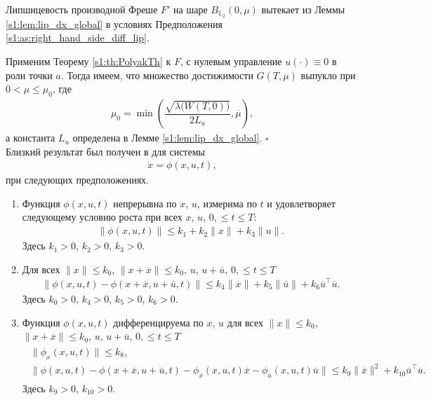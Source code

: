 \documentclass[../main.tex]{subfiles}
\begin{document}
Липшицевость производной Фреше $F'$ на шаре $B_{\mathbb{L}_2}(0,\mu)$ вытекает из Леммы \ref{s1:lem:lip_dx_global} в условиях Предположения \ref{s1:as:right_hand_side_diff_lip}. 
 
Применим Теорему \ref{s1:th:PolyakTh} к $F$, с нулевым управление $u(\cdot) \equiv 0$ в роли точки $a$. 
Тогда имеем, что множество достижимости $G(T,\mu)$ выпукло при $ 0 < \mu \leqslant \mu_0 $, где 
\begin{gather}\label{s1:mu0}
 \mu_0 = \min\left( \dfrac{\sqrt{\lambda\big(W(T,0)\big)}}{2L_u}, \overline{\mu} \right), 
\end{gather}
а константа $L_u $ определена в Лемме \ref{s1:lem:lip_dx_global}. 
\hfill$\square$\\[1ex]%
Близкий результат был получен в \cite{Polyak2004} для системы
\begin{gather}
	\dot{x} = \phi(x,u,t),
\end{gather}
при следующих предположениях.
\begin{enumerate}
	\item Функция $ \phi(x,u,t)$ непрерывна по $x$, $u$, измерима по $t$ и удовлетворяет следующему условию роста при всех $x$, $u$, $0, \leqslant t \leqslant T$:
	\begin{gather}
		\|\phi(x,u,t) \| \leqslant k_1 + k_2 \|x\| + k_3 \|u\|.
	\end{gather}
	Здесь $k_1 > 0$, $k_2 > 0$, $k_3 > 0$.
	
	\item Для всех $\|x\| \leqslant k_0$, $\|x + \overline{x}\| \leqslant k_0$, $u$, $u + \overline{u}$, $0, \leqslant t \leqslant T$
	\begin{gather}
		\|\phi(x,u,t) - \phi(x + \overline{x},u + \overline{u},t)\| \leqslant k_4 \|\overline{x}\| + k_5 \|\overline{u}\| + k_6 \overline{u}^{\top} \overline{u}.
	\end{gather}
	Здесь $k_0 > 0$, $k_4 > 0$, $k_5 > 0$, $k_6 > 0$.
	
	\item Функция $ \phi(x,u,t)$ дифференцируема по $x$, $u$ для всех $\|x\| \leqslant k_0$, $\|x + \overline{x}\| \leqslant k_0$, $u$, $u + \overline{u}$, $0, \leqslant t \leqslant T$
	\begin{gather}
	\begin{gathered}
				\| \phi_x(x,u,t) \| \leqslant k_8, \\
				\|\phi(x,u,t) - \phi(x + \overline{x},u + \overline{u},t) -\phi_x(x,u,t) \overline{x} - \phi_u(x,u,t)\overline{u} \| \leqslant k_9 \|\overline{x}\|^2 + k_{10} \overline{u}^{\top} \overline{u}.
	\end{gathered}
	\end{gather}
	Здесь $k_9 > 0$, $k_{10} > 0$.
\end{enumerate}
 
\end{document}
